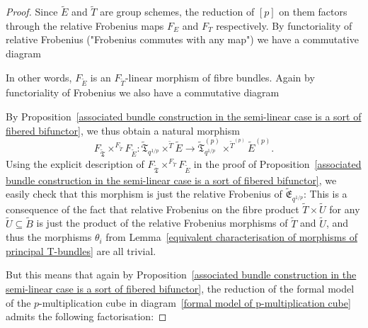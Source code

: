 \documentclass[10pt,oneside]{amsart}
\theoremstyle{definition}
\theoremstyle{remark}
\begin{document}
\begin{proof}
	Since $\tilde{E}$ and $\tilde{T}$ are group schemes, the reduction of $[p]$ on them factors through the relative Frobenius maps $F_E$ and $F_T$ respectively. By functoriality of relative Frobenius ("Frobenius commutes with any map") we have a commutative diagram
	\begin{center}
	\end{center}
	In other words, $F_{\tilde E}$ is an $F_{\tilde T}$-linear morphism of fibre bundles. Again by functoriality of Frobenius we also have a commutative diagram
	\begin{center}
	\end{center}
	
	By Proposition~\ref{associated bundle construction in the semi-linear case is a sort of fibered bifunctor}, we thus obtain a natural morphism
	\[F_{\tilde{\mathfrak{T}}}\times^{F_{\tilde{T}}} F_{\tilde
		E}:\tilde{\mathfrak T}_{q^{1/p}}\times^{\tilde T}\tilde E \rightarrow \tilde{\mathfrak T}_{q^{1/p}}^{(p)}\times^{\tilde T^{(p)}}\tilde E^{(p)}. \]
	Using the explicit description of $F_{\tilde{\mathfrak{T}}}\times^{F_{\tilde{T}}} F_{\tilde
		E}$ in the proof of Proposition~\ref{associated bundle construction in the semi-linear case is a sort of fibered bifunctor}, we easily check that this morphism is just the relative Frobenius of $\tilde{\mathfrak{E}}_{q^{1/p}}$: This is a consequence of the fact that relative Frobenius on the fibre product $\tilde{T}\times \tilde{U}$ for any $\tilde{U}\subseteq \tilde{B}$ is just the product of the relative Frobenius morphisms of $\tilde T$ and $\tilde U$, and thus the morphisms $\theta_i$ from Lemma~\ref{equivalent characterisation of morphisms of principal T-bundles} are all trivial. 
	
	But this means that again by Proposition~\ref{associated bundle construction in the semi-linear case is a sort of fibered bifunctor}, the reduction of the formal model of the $p$-multiplication cube in diagram~\ref{formal model of p-multiplication cube} admits the following factorisation:
	

\end{proof}
\end{document}
